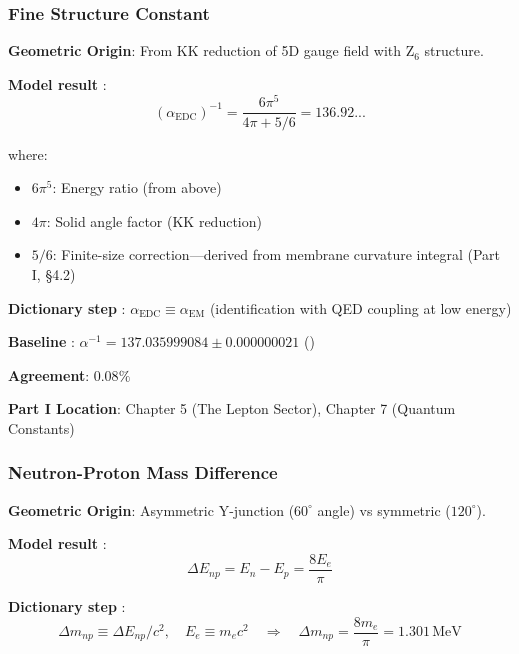 
\subsubsection{Fine Structure Constant}

\textbf{Geometric Origin}: From KK reduction of 5D gauge field with Z$_6$ structure.

\textbf{Model result} \tagDerSym{}:
\begin{equation}
(\alpha_{\text{EDC}})^{-1} = \frac{6\pi^5}{4\pi + 5/6} = 136.92...
\label{eq:alpha_bridge}
\end{equation}

where:
\begin{itemize}[nosep]
\item $6\pi^5$: Energy ratio (from above) \tagDerSym{}
\item $4\pi$: Solid angle factor (KK reduction) \tagM{}
\item $5/6$: Finite-size correction---derived from membrane curvature integral (Part I, \S4.2) \tagDcApprox{}
\end{itemize}

\textbf{Dictionary step} \tagDc{}:
$\alpha_{\text{EDC}} \equiv \alpha_{\text{EM}}$ (identification with QED coupling at low energy)

\textbf{Baseline} \tagBL{}: $\alpha^{-1} = 137.035999084 \pm 0.000000021$ ()

\textbf{Agreement}: $0.08\%$

\textbf{Part I Location}: Chapter 5 (The Lepton Sector), Chapter 7 (Quantum Constants)


\subsubsection{Neutron-Proton Mass Difference}

\textbf{Geometric Origin}: Asymmetric Y-junction ($60^\circ$ angle) vs symmetric ($120^\circ$).

\textbf{Model result} \tagDerSym{}:
\begin{equation}
\Delta E_{np} = E_n - E_p = \frac{8 E_e}{\pi}
\label{eq:deltaEnp_bridge}
\end{equation}

\textbf{Dictionary step} \tagDc{}:
\begin{equation}
\Delta m_{np} \equiv \Delta E_{np}/c^2, \quad E_e \equiv m_e c^2
\quad\Rightarrow\quad
\Delta m_{np} = \frac{8 m_e}{\pi} = 1.301\,\text{MeV}
\label{eq:deltamnp_bridge}
\end{equation}

